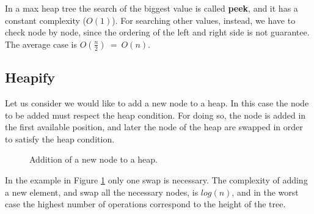 In a max heap tree the search of the biggest value is called \textbf{peek}, and it has a constant complexity (\(O(1)\)). For searching other values, instead, we have to check node by node, since the ordering of the left and right side is not guarantee. The average case is \(O(\frac{n}{2})\ = \ O(n)\).
\subsection{Heapify}
Let us consider we would like to add a new node to a heap. In this case the node to be added must respect the heap condition. For doing so, the node is added in the first available position, and later the node of the heap are swapped in order to satisfy the heap condition.

\begin{figure}[H]
\centering
{}
\caption[Addition of a new node to a heap.]{Addition of a new node to a heap.}
\label{trees_17}
\end{figure}

In the example in Figure \ref{trees_17} only one swap is necessary. The complexity of adding a new element, and swap all the necessary nodes, is \(log(n)\), and in the worst case the highest number of operations correspond to the height of the tree.

